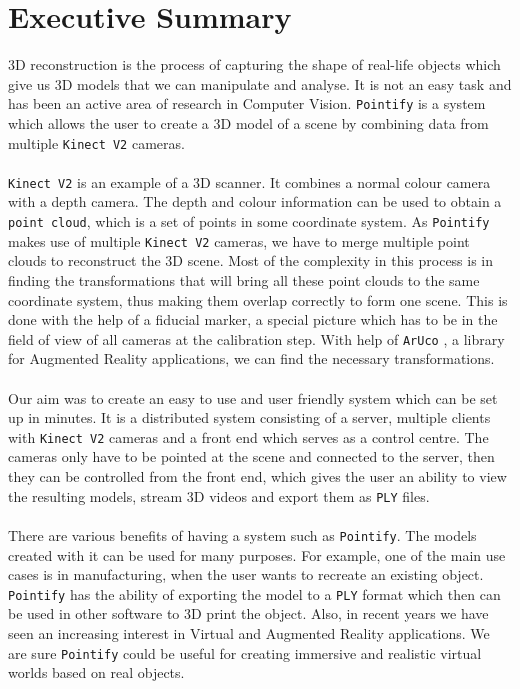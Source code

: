 \documentclass{article}
\begin{document}
\section{Executive Summary}
3D reconstruction is the process of capturing the shape of real-life objects which give us 3D models that we can manipulate and analyse. It is not an easy task and has been an active area of research in Computer Vision. \texttt{Pointify} is a system which allows the user to create a 3D model of a scene by combining data from multiple \texttt{Kinect V2} cameras.
\\
\\
\texttt{Kinect V2} is an example of a 3D scanner. It combines a normal colour camera with a depth camera. The depth and colour information can be used to obtain a \texttt{point cloud}, which is a set of points in some coordinate system. As \texttt{Pointify} makes use of multiple \texttt{Kinect V2} cameras, we have to merge multiple point clouds to reconstruct the 3D scene. Most of the complexity in this process is in finding the transformations that will bring all these point clouds to the same coordinate system, thus making them overlap correctly to form one scene. This is done with the help of a fiducial marker, a special picture which has to be in the field of view of all cameras at the calibration step. With help of \texttt{ArUco} \cite{aruco}, a library for Augmented Reality applications, we can find the necessary transformations.
\\
\\
Our aim was to create an easy to use and user friendly system which can be set up in minutes. It is a distributed system consisting of a server, multiple clients with \texttt{Kinect V2} cameras and a front end which serves as a control centre. The cameras only have to be pointed at the scene and connected to the server, then they can be controlled from the front end, which gives the user an ability to view the resulting models, stream 3D videos and export them as \texttt{PLY} files.
\\
\\
There are various benefits of having a system such as \texttt{Pointify}. The models created with it can be used for many purposes. For example, one of the main use cases is in manufacturing, when the user wants to recreate an existing object. \texttt{Pointify} has the ability of exporting the model to a \texttt{PLY} format which then can be used in other software to 3D print the object. Also, in recent years we have seen an increasing interest in Virtual and Augmented Reality applications. We are sure \texttt{Pointify} could be useful for creating immersive and realistic virtual worlds based on real objects.
\\
\\
\end{document}
